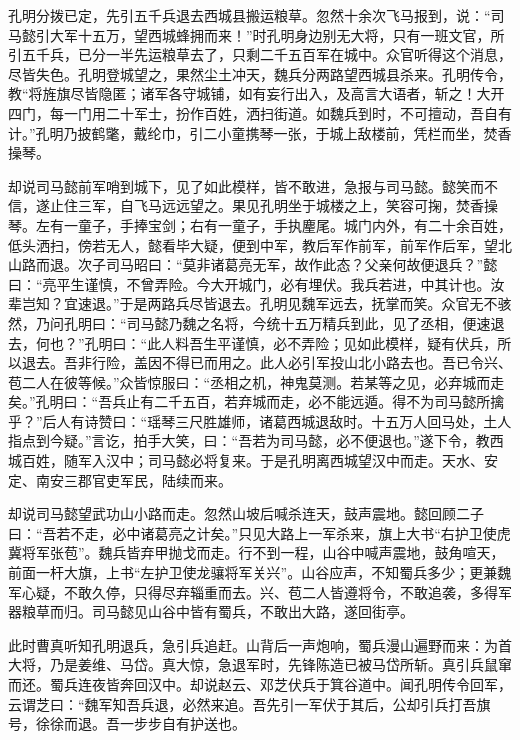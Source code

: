 孔明分拨已定，先引五千兵退去西城县搬运粮草。忽然十余次飞马报到，说：“司马懿引大军十五万，望西城蜂拥而来！”时孔明身边别无大将，只有一班文官，所引五千兵，已分一半先运粮草去了，只剩二千五百军在城中。众官听得这个消息，尽皆失色。孔明登城望之，果然尘土冲天，魏兵分两路望西城县杀来。孔明传令，教“将旌旗尽皆隐匿；诸军各守城铺，如有妄行出入，及高言大语者，斩之！大开四门，每一门用二十军士，扮作百姓，洒扫街道。如魏兵到时，不可擅动，吾自有计。”孔明乃披鹤氅，戴纶巾，引二小童携琴一张，于城上敌楼前，凭栏而坐，焚香操琴。

却说司马懿前军哨到城下，见了如此模样，皆不敢进，急报与司马懿。懿笑而不信，遂止住三军，自飞马远远望之。果见孔明坐于城楼之上，笑容可掬，焚香操琴。左有一童子，手捧宝剑；右有一童子，手执麈尾。城门内外，有二十余百姓，低头洒扫，傍若无人，懿看毕大疑，便到中军，教后军作前军，前军作后军，望北山路而退。次子司马昭曰：“莫非诸葛亮无军，故作此态？父亲何故便退兵？”懿曰：“亮平生谨慎，不曾弄险。今大开城门，必有埋伏。我兵若进，中其计也。汝辈岂知？宜速退。”于是两路兵尽皆退去。孔明见魏军远去，抚掌而笑。众官无不骇然，乃问孔明曰：“司马懿乃魏之名将，今统十五万精兵到此，见了丞相，便速退去，何也？”孔明曰：“此人料吾生平谨慎，必不弄险；见如此模样，疑有伏兵，所以退去。吾非行险，盖因不得已而用之。此人必引军投山北小路去也。吾已令兴、苞二人在彼等候。”众皆惊服曰：“丞相之机，神鬼莫测。若某等之见，必弃城而走矣。”孔明曰：“吾兵止有二千五百，若弃城而走，必不能远遁。得不为司马懿所擒乎？”后人有诗赞曰：“瑶琴三尺胜雄师，诸葛西城退敌时。十五万人回马处，土人指点到今疑。”言讫，拍手大笑，曰：“吾若为司马懿，必不便退也。”遂下令，教西城百姓，随军入汉中；司马懿必将复来。于是孔明离西城望汉中而走。天水、安定、南安三郡官吏军民，陆续而来。

却说司马懿望武功山小路而走。忽然山坡后喊杀连天，鼓声震地。懿回顾二子曰：“吾若不走，必中诸葛亮之计矣。”只见大路上一军杀来，旗上大书“右护卫使虎冀将军张苞”。魏兵皆弃甲抛戈而走。行不到一程，山谷中喊声震地，鼓角喧天，前面一杆大旗，上书“左护卫使龙骧将军关兴”。山谷应声，不知蜀兵多少；更兼魏军心疑，不敢久停，只得尽弃辎重而去。兴、苞二人皆遵将令，不敢追袭，多得军器粮草而归。司马懿见山谷中皆有蜀兵，不敢出大路，遂回街亭。

此时曹真听知孔明退兵，急引兵追赶。山背后一声炮响，蜀兵漫山遍野而来：为首大将，乃是姜维、马岱。真大惊，急退军时，先锋陈造已被马岱所斩。真引兵鼠窜而还。蜀兵连夜皆奔回汉中。却说赵云、邓芝伏兵于箕谷道中。闻孔明传令回军，云谓芝曰：“魏军知吾兵退，必然来追。吾先引一军伏于其后，公却引兵打吾旗号，徐徐而退。吾一步步自有护送也。

